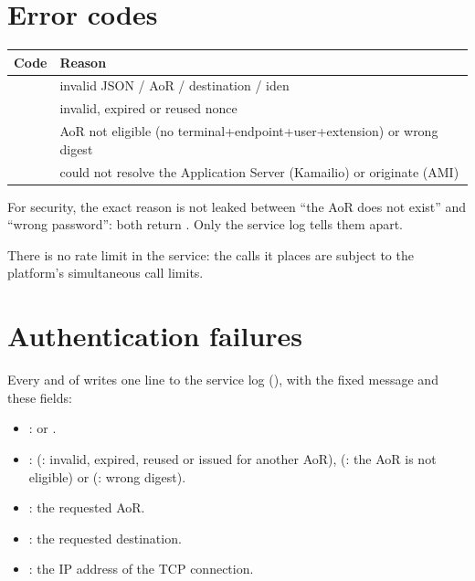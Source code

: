 \documentclass[letterpaper,10pt,english]{sphinxmanual}
\begin{document}
\section{Error codes}
\label{api_rest/click2call:error-codes}
\noindent\begin{tabulary}{\linewidth}{|L|L|}
\hline
\textsf{\relax 
Code
\unskip}\relax &\textsf{\relax 
Reason
\unskip}\relax \\
\hline
{}
&
invalid JSON / AoR / destination / iden
\\
\hline
{}
&
invalid, expired or reused nonce
\\
\hline
{}
&
AoR not eligible (no terminal+endpoint+user+extension) or wrong digest
\\
\hline
{}
&
could not resolve the Application Server (Kamailio) or originate (AMI)
\\
\hline\end{tabulary}


For security, the exact reason is not leaked between ``the AoR does not exist'' and
``wrong password'': both return . Only the service log tells them apart.

There is no rate limit in the service: the calls it places are subject to the
platform's simultaneous call limits.


\section{Authentication failures}
\label{api_rest/click2call:authentication-failures}
Every  and  of  writes one  line to the service
log (), with the fixed message
 and these fields:
\begin{itemize}
\item {} 
:  or .

\item {} 
:  (: invalid, expired, reused or issued for
another AoR),  (: the AoR is not eligible) or
 (: wrong digest).

\item {} 
: the requested AoR.

\item {} 
: the requested destination.

\item {} 
: the IP address of the TCP connection.

\end{itemize}
\end{document}
